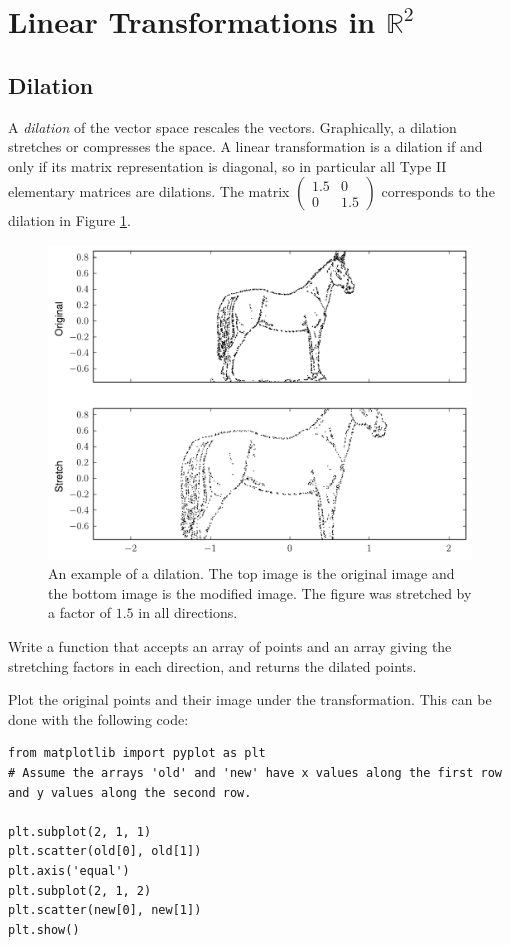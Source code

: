 \label{lab:ChangeBasis}

\section*{Linear Transformations in $\mathbb{R}^2$}
\subsection*{Dilation}
A \emph{dilation} of the vector space rescales the vectors. Graphically, a dilation stretches or compresses the space. A linear transformation is a dilation if and only if its matrix representation is diagonal, so in particular all Type II elementary matrices are dilations. The matrix $\begin{pmatrix}
1.5 & 0\\
0 & 1.5 \end{pmatrix}$ corresponds to the dilation in Figure \ref{dilation_fig}.
\begin{figure}
\includegraphics[width=\textwidth]{stretch.pdf}
\caption{An example of a dilation. The top image is the original image and the bottom image is the modified image. The figure was stretched by a factor of $1.5$ in all directions.}
\label{dilation_fig}
\end{figure}

\begin{problem}
Write a function that accepts an array of points and an array giving the stretching factors in each direction, and returns the dilated points. 

Plot the original points and their image under the transformation. This can be done with the following code:
\begin{lstlisting}
from matplotlib import pyplot as plt
# Assume the arrays 'old' and 'new' have x values along the first row and y values along the second row.

plt.subplot(2, 1, 1)
plt.scatter(old[0], old[1])
plt.axis('equal')
plt.subplot(2, 1, 2)
plt.scatter(new[0], new[1])
plt.show()
\end{lstlisting}
\end{problem}

